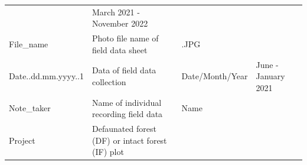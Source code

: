 \documentclass[
  12pt,
]{article}
\begin{document}
\begin{longtable}[]{@{}llll@{}}
\begin{minipage}[t]{0.18\columnwidth}
\end{minipage} & \begin{minipage}[t]{0.18\columnwidth}\raggedright
March 2021 - November 2022\strut
\end{minipage}\tabularnewline
\begin{minipage}[t]{0.18\columnwidth}\raggedright
File\_name\strut
\end{minipage} & \begin{minipage}[t]{0.35\columnwidth}\raggedright
Photo file name of field data sheet\strut
\end{minipage} & \begin{minipage}[t]{0.18\columnwidth}\raggedright
.JPG\strut
\end{minipage} & \begin{minipage}[t]{0.18\columnwidth}\raggedright
\strut
\end{minipage}\tabularnewline
\begin{minipage}[t]{0.18\columnwidth}\raggedright
Date..dd.mm.yyyy..1\strut
\end{minipage} & \begin{minipage}[t]{0.35\columnwidth}\raggedright
Data of field data collection\strut
\end{minipage} & \begin{minipage}[t]{0.18\columnwidth}\raggedright
Date/Month/Year\strut
\end{minipage} & \begin{minipage}[t]{0.18\columnwidth}\raggedright
June - January 2021\strut
\end{minipage}\tabularnewline
\begin{minipage}[t]{0.18\columnwidth}\raggedright
Note\_taker\strut
\end{minipage} & \begin{minipage}[t]{0.35\columnwidth}\raggedright
Name of individual recording field data\strut
\end{minipage} & \begin{minipage}[t]{0.18\columnwidth}\raggedright
Name\strut
\end{minipage} & \begin{minipage}[t]{0.18\columnwidth}\raggedright
\strut
\end{minipage}\tabularnewline
\begin{minipage}[t]{0.18\columnwidth}\raggedright
Project\strut
\end{minipage} & \begin{minipage}[t]{0.35\columnwidth}\raggedright
Defaunated forest (DF) or intact forest (IF) plot\strut

\end{minipage}
\end{longtable}
\end{document}
